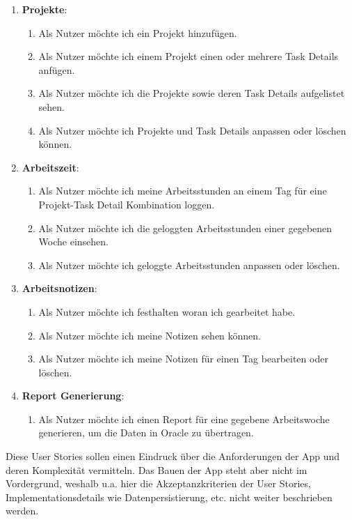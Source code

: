 \documentclass[oneside,bibliography=totocnumbered,BCOR=5mm]{scrbook}
\begin{document}
\begin{enumerate}
  \item \textbf{Projekte}:
    \begin{enumerate}
      \item Als Nutzer möchte ich ein Projekt hinzufügen.
      \item Als Nutzer möchte ich einem Projekt einen oder mehrere Task Details anfügen.
      \item Als Nutzer möchte ich die Projekte sowie deren Task Details aufgelistet sehen.
      \item Als Nutzer möchte ich Projekte und Task Details anpassen oder löschen können.
    \end{enumerate}
  \item \textbf{Arbeitszeit}:
    \begin{enumerate}
      \item Als Nutzer möchte ich meine Arbeitsstunden an einem Tag für eine Projekt-Task Detail Kombination loggen.
      \item Als Nutzer möchte ich die geloggten Arbeitsstunden einer gegebenen Woche einsehen.
      \item Als Nutzer möchte ich geloggte Arbeitsstunden anpassen oder löschen.
    \end{enumerate}
  \item \textbf{Arbeitsnotizen}:
    \begin{enumerate}
      \item Als Nutzer möchte ich festhalten woran ich gearbeitet habe.
      \item Als Nutzer möchte ich meine Notizen sehen können.
      \item Als Nutzer möchte ich meine Notizen für einen Tag bearbeiten oder löschen.
    \end{enumerate}
  \item \textbf{Report Generierung}:
    \begin{enumerate}
      \item Als Nutzer möchte ich einen Report für eine gegebene Arbeitswoche generieren, um die Daten in Oracle zu übertragen.
    \end{enumerate}
\end{enumerate}

Diese User Stories sollen einen Eindruck über die Anforderungen der App
und deren Komplexität vermitteln. Das Bauen der App steht aber nicht im
Vordergrund, weshalb u.a. hier die Akzeptanzkriterien der User Stories,
Implementationsdetails wie Datenpersistierung, etc. nicht weiter beschrieben
werden.
\end{document}
